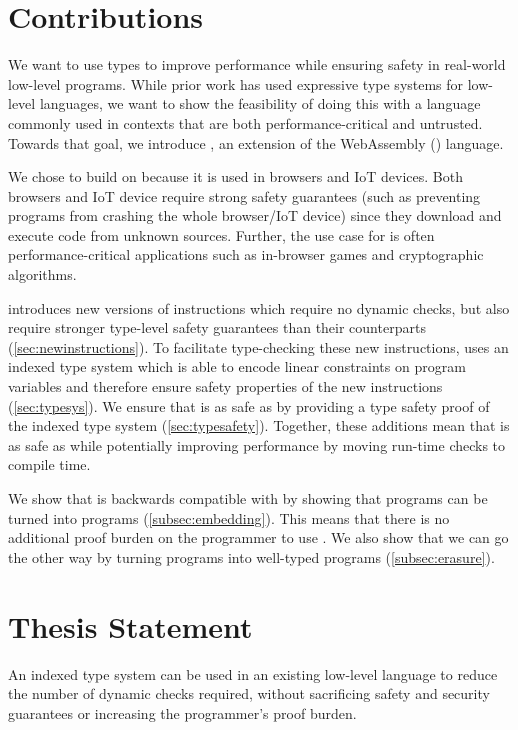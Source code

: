 \section{Contributions}
We want to use types to improve performance while ensuring safety in real-world low-level programs.
While prior work has used expressive type systems for low-level languages, we want to show the feasibility of doing this with a language commonly used in contexts that are both performance-critical and untrusted.
Towards that goal, we introduce \name, an extension of the WebAssembly (\wasm) language.

We chose \wasm to build on because it is used in browsers and IoT devices.
Both browsers and IoT device require strong safety guarantees (such as preventing programs from crashing the whole browser/IoT device) since they download and execute code from unknown sources.
Further, the use case for \wasm is often performance-critical applications such as in-browser games and cryptographic algorithms.

\name introduces new versions of \wasm instructions which require no dynamic checks, but also require stronger type-level safety guarantees than their \wasm counterparts (\autoref{sec:newinstructions}).
To facilitate type-checking these new instructions, \name uses an indexed type system which is able to encode linear constraints on program variables and therefore ensure safety properties of the new \name instructions (\autoref{sec:typesys}).
We ensure that \name is as safe as \wasm by providing a type safety proof of the \name indexed type system (\autoref{sec:typesafety}).
Together, these additions mean that \name is as safe as \wasm while potentially improving performance by moving run-time checks to compile time.

We show that \name is backwards compatible with \wasm by showing that \wasm programs can be turned into \name programs (\autoref{subsec:embedding}).
This means that there is no additional proof burden on the programmer to use \name.
We also show that we can go the other way by turning \name programs into well-typed \wasm programs (\autoref{subsec:erasure}).

\section{Thesis Statement}
\begin{adjustwidth}{1cm}{1cm}
    An indexed type system can be used in an existing low-level language to reduce the number of dynamic checks required, without sacrificing safety and security guarantees or increasing the programmer's proof burden.
\end{adjustwidth}
